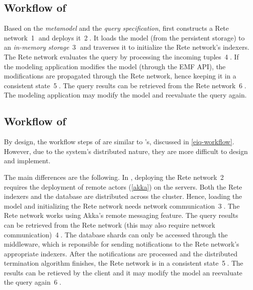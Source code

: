 \subsection{Workflow of \eiq{}}
\label{eiq-workflow}

Based on the \emph{metamodel} and the \emph{query specification}, \eiq{} first constructs a Rete network~\textcircled{1} and deploys it~\textcircled{2}. It loads the model (from the persistent storage) to an \emph{in-memory storage}~\textcircled{3} and traverses it to initialize the Rete network's indexers. The Rete network evaluates the query by processing the incoming tuples~\textcircled{4}. If the modeling application modifies the model (through the EMF API), the modifications are propagated through the Rete network, hence keeping it in a consistent state~\textcircled{5}. The query results can be retrieved from the Rete network~\textcircled{6}. The modeling application may modify the model and reevaluate the query again.

\subsection{Workflow of \iqd{}}
\label{iqd-workflow}

By design, the workflow steps of \iqd{} are similar to \eiq{}'s, discussed in \autoref{eiq-workflow}. However, due to the system's distributed nature, they are more difficult to design and implement.

The main differences are the following. In \iqd{}, deploying the Rete network~\textcircled{2} requires the deployment of remote actors (\autoref{akka}) on the servers. Both the Rete indexers and the database are distributed across the cluster. Hence, loading the model and initializing the Rete network needs network communication~\textcircled{3}. The Rete network works using Akka's remote messaging feature. The query results can be retrieved from the Rete network (this may also require network communication)~\textcircled{4}. The database shards can only be accessed through the middleware, which is reponsible for sending notifications to the Rete network's appropriate indexers. After the notifications are processed and the distributed termination algorithm finishes, the Rete network is in a consistent state~\textcircled{5}. The results can be retieved by the client and it may modify the model an reevaluate the query again~\textcircled{6}. 




